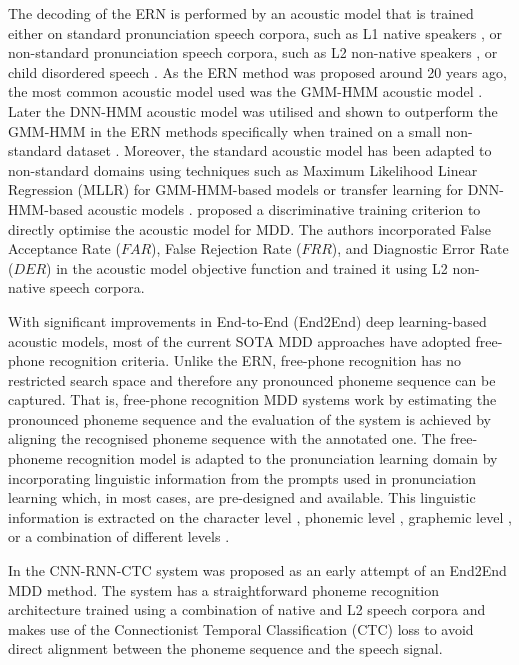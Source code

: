 \documentclass[12pt]{elsarticle}
\begin{document}
The decoding of the ERN is performed by an acoustic model that is trained either on standard pronunciation speech corpora, such as L1 native speakers \cite{RN42, RN94}, or non-standard pronunciation speech corpora, such as L2 non-native speakers \cite{RN130, RN131}, or child disordered speech \cite{RN37}. As the ERN method was proposed around 20 years ago, the most common acoustic model used was the GMM-HMM acoustic model \cite{RN33, RN42, RN94, RN128, RN130}. Later the DNN-HMM acoustic model was utilised \cite{RN34, RN37, RN45, RN131} and shown to outperform the GMM-HMM in the ERN methods specifically when trained on a small non-standard dataset \cite{RN37}. Moreover, the standard acoustic model has been adapted to non-standard domains using techniques such as Maximum Likelihood Linear Regression (MLLR) for GMM-HMM-based models \cite{RN33, RN128} or transfer learning for DNN-HMM-based acoustic models \cite{RN45}. \cite{RN130} proposed a discriminative training criterion to directly optimise the acoustic model for MDD. The authors incorporated False Acceptance Rate ($FAR$), False Rejection Rate ($FRR$), and Diagnostic Error Rate ($DER$) in the acoustic model objective function and trained it using L2 non-native speech corpora.

With significant improvements in End-to-End (End2End) deep learning-based acoustic models, most of the current SOTA MDD approaches have adopted free-phone recognition criteria. Unlike the ERN, free-phone recognition has no restricted search space and therefore any pronounced phoneme sequence can be captured. That is, free-phone recognition MDD systems work by estimating the pronounced phoneme sequence and the evaluation of the system is achieved by aligning the recognised phoneme sequence with the annotated one. The free-phoneme recognition model is adapted to the pronunciation learning domain by incorporating linguistic information from the prompts used in pronunciation learning which, in most cases, are pre-designed and available. This linguistic information is extracted on the character level \cite{RN31}, phonemic level \cite{RN32, RN95, RN132, RN133}, graphemic level \cite{RN95}, or a combination of different levels \cite{RN95}.

In \cite{RN30} the CNN-RNN-CTC system was proposed as an early attempt of an End2End MDD method. The system has a straightforward phoneme recognition architecture trained using a combination of native and L2 speech corpora and makes use of the Connectionist Temporal Classification (CTC) loss to avoid direct alignment between the phoneme sequence and the speech signal.
\end{document}
